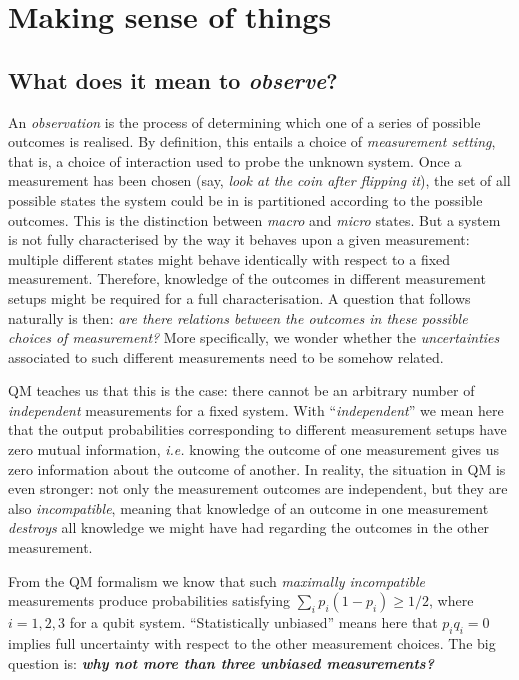 \documentclass[12pt]{report}
\begin{document}
\chapter{Making sense of things}

\section{What does it mean to \emph{observe}?}

An \emph{observation} is the process of determining which one of a series of possible outcomes is realised. By definition, this entails a choice of \emph{measurement setting}, that is, a choice of interaction used to probe the unknown system.
Once a measurement has been chosen (say, \emph{look at the coin after flipping it}), the set of all possible states the system could be in is partitioned according to the possible outcomes. This is the distinction between \emph{macro} and \emph{micro} states.
But a system is not fully characterised by the way it behaves upon a given measurement: multiple different states might behave identically with respect to a fixed measurement. Therefore, knowledge of the outcomes in different measurement setups might be required for a full characterisation.
A question that follows naturally is then: \emph{are there relations between the outcomes in these possible choices of measurement?}
More specifically, we wonder whether the \emph{uncertainties} associated to such different measurements need to be somehow related.

QM teaches us that this is the case: there cannot be an arbitrary number of \emph{independent} measurements for a fixed system.
With ``\emph{independent}'' we mean here that the output probabilities corresponding to different measurement setups have zero mutual information, \emph{i.e.} knowing the outcome of one measurement gives us zero information about the outcome of another.
In reality, the situation in QM is even stronger: not only the measurement outcomes are independent, but they are also \emph{incompatible}, meaning that knowledge of an outcome in one measurement \emph{destroys} all knowledge we might have had regarding the outcomes in the other measurement.

From the QM formalism we know that such \emph{maximally incompatible} measurements produce probabilities satisfying $\sum_i p_i (1-p_i)\ge1/2$, where $i=1,2,3$ for a qubit system.
``Statistically unbiased'' means here that $p_i q_i=0$ implies full uncertainty with respect to the other measurement choices. The big question is: \textcolor{RedOrange}{\emph{\textbf{why not more than three unbiased measurements?}}}
\end{document}
